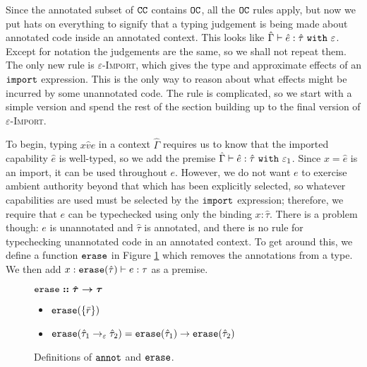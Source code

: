Since the annotated subset of $\mathtt{CC}$ contains $\mathtt{OC}$, all the $\mathtt{OC}$ rules apply, but now we put hats on everything to signify that a typing judgement is being made about annotated code inside an annotated context. This looks like $\hat \Gamma \vdash \hat e: \hat \tau~\mathtt{with}~ \varepsilon$. Except for notation the judgements are the same, so we shall not repeat them. The only new rule is \textsc{$\varepsilon$-Import}, which gives the type and approximate effects of an $\mathtt{import}$ expression. This is the only way to reason about what effects might be incurred by some unannotated code. The rule is complicated, so we start with a simple version and spend the rest of the section building up to the final version of \textsc{$\varepsilon$-Import}.

To begin, typing ${x}{\hat v}{e}$ in a context $\hat \Gamma$ requires us to know that the imported capability $\hat e$ is well-typed, so we add the premise $\hat \Gamma \vdash \hat e: \hat \tau~\mathtt{with}~ \varepsilon_1$. Since $x = \hat e$ is an import, it can be used throughout $e$. However, we do not want $e$ to exercise ambient authority beyond that which has been explicitly selected, so whatever capabilities are used must be selected by the $\mathtt{import}$ expression; therefore, we require that $e$ can be typechecked using only the binding $x: \hat \tau$. There is a problem though: $e$ is unannotated and $\hat \tau$ is annotated, and there is no rule for typechecking unannotated code in an annotated context. To get around this, we define a function $\mathtt{erase}$ in Figure \ref{fig:erase_defn} which removes the annotations from a type. We then add $x: \mathtt{erase}(\hat \tau) \vdash e: \tau$ as a premise.

\begin{figure}[h]
\vspace{-5pt}

$\bm{\mathtt{erase :: \hat \tau \rightarrow \tau}}$
\begin{itemize}
	\setlength\itemsep{-0.7em}
	\item[] $\mathtt{erase}(\{ \bar r \})$
	\item[] $\mathtt{erase}(\hat \tau_1 \rightarrow_{\varepsilon} \hat \tau_2) = \mathtt{erase}(\hat \tau_1) \rightarrow \mathtt{erase}(\hat \tau_2)$
\end{itemize}


\vspace{-7pt}
\caption{Definitions of $\mathtt{annot}$ and $\mathtt{erase}$.}
\label{fig:erase_defn}
\end{figure}

